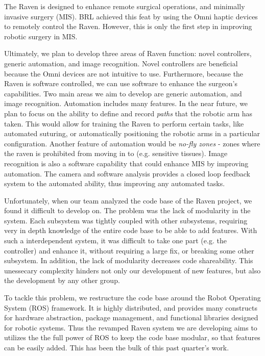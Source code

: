 \documentclass[letterpaper,twocolumn,10pt]{article}
\begin{document}
The Raven is designed to enhance remote surgical operations, and 
minimally invasive surgery (MIS). BRL achieved this feat by using the 
Omni haptic devices to remotely control the Raven. However, this is 
only the first step in improving robotic surgery in MIS.

Ultimately, we plan to develop three areas of Raven function: novel 
controllers, generic automation, and image recognition. Novel 
controllers are beneficial because the Omni devices are not intuitive 
to use.
Furthermore, because the Raven is software controlled, we can use 
software to enhance the surgeon's capabilities. Two main areas we 
aim to develop are generic automation, and image recognition. 
Automation includes many features. In the near future, we plan to 
focus on the ability to define and record \emph{paths} that the 
robotic arm has taken. This would allow for training the Raven to 
perform certain tasks, like automated suturing, or automatically 
positioning the robotic arms in a particular configuration. Another 
feature of automation would be \emph{no-fly zones} - zones where 
the raven is prohibited from moving in to (e.g. sensitive tissues). 
Image recognition is also a software capability that could enhance 
MIS by improving automation. The camera and software analysis provides 
a closed loop feedback system to the automated ability, thus improving 
any automated tasks.

Unfortunately, when our team analyzed the code base of the Raven 
project, we found it difficult to develop on. The problem was the lack 
of modularity in the system. Each subsystem was tightly coupled with 
other subsystems, requiring very in depth knowledge of the entire 
code base to be able to add features. With such a interdependent 
system, it was difficult to take one part (e.g. the controller) and 
enhance it, without requiring a large fix, or breaking some other 
subsystem. In addition, the lack of modularity decreases code 
shareability. This unessecary complexity hinders not only our 
development of new features, but also the development by any other 
group.

To tackle this problem, we restructure the code base around the Robot
Operating System (ROS) framework. It is highly distributed, and 
provides many constructs for hardware abstraction, package management, 
and functional libraries designed for robotic systems. Thus the 
revamped Raven system we are developing aims to utilizes the the full 
power  of ROS to keep the code base modular, so that features can be 
easily added. This has been the bulk of this past quarter's work.
\end{document}
